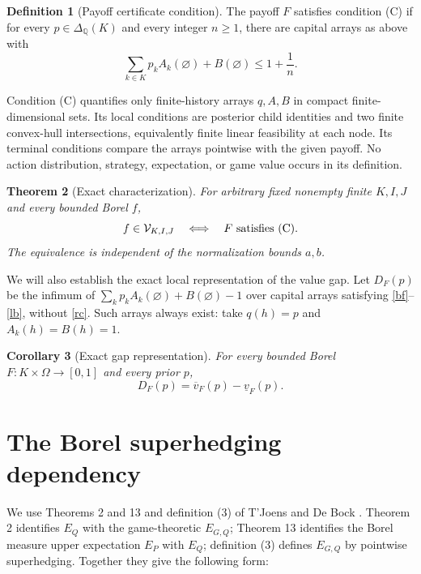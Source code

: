 \documentclass[11pt,a4paper]{article}
\newtheorem{theorem}{Theorem}
\newtheorem{corollary}[theorem]{Corollary}
\theoremstyle{definition}
\newtheorem{definition}[theorem]{Definition}
\newcommand{\lv}{\underline v}
\newcommand{\uv}{\overline v}
\begin{document}
\begin{definition}[Payoff certificate condition]
The payoff $F$ satisfies condition \textup{(C)} if for every
$p\in\Delta_{\mathbb Q}(K)$ and every integer $n\geq1$, there are capital
arrays as above with
\begin{equation}
 \sum_{k\in K}p_k A_k(\varnothing)+B(\varnothing)\leq1+\frac1n.
 \tag{RC}\label{rc}
\end{equation}
\end{definition}

Condition (C) quantifies only finite-history arrays $q,A,B$ in compact
finite-dimensional sets. Its local conditions are posterior child
identities and two finite convex-hull intersections, equivalently finite
linear feasibility at each node. Its terminal conditions compare the
arrays pointwise with the given payoff. No action distribution,
strategy, expectation, or game value occurs in its definition.

\begin{theorem}[Exact characterization]\label{main}
For arbitrary fixed nonempty finite $K,I,J$ and every bounded Borel $f$,
\[
 f\in\mathcal V_{K,I,J}\quad\Longleftrightarrow\quad
 F\text{ satisfies \textup{(C)}}.
\]
The equivalence is independent of the normalization bounds $a,b$.
\end{theorem}

We will also establish the exact local representation of the value gap.
Let $D_F(p)$ be the infimum of
$\sum_k p_k A_k(\varnothing)+B(\varnothing)-1$ over capital arrays
satisfying \eqref{bf}--\eqref{lb}, without \eqref{rc}. Such arrays always
exist: take $q(h)=p$ and $A_k(h)=B(h)=1$.

\begin{corollary}[Exact gap representation]\label{rep}
For every bounded Borel $F:K\times\Omega\to[0,1]$ and every prior $p$,
\[
 D_F(p)=\uv_F(p)-\lv_F(p).
\]
\end{corollary}

\section{The Borel superhedging dependency}

We use Theorems 2 and 13 and definition (3) of T'Joens and De Bock
\cite{TDB}. Theorem 2 identifies $E_Q$ with the game-theoretic
$E_{G,Q}$; Theorem 13 identifies the Borel measure upper expectation
$E_P$ with $E_Q$; definition (3) defines $E_{G,Q}$ by pointwise
superhedging. Together they give the following form:
\end{document}
